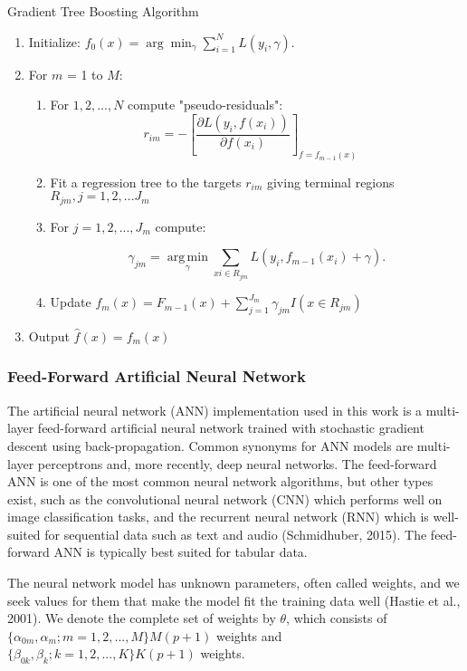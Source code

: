 \documentclass[12pt,]{article}
\begin{document}
\begin{algorithm}
  \caption{Gradient Tree Boosting Algorithm}\label{alg:GBMAlo}
\begin{enumerate}
\item Initialize: $f_0(x) = \arg\min_\gamma \sum_{i=1}^N L(y_i, \gamma).$
\item For $m$ = 1 to $M$:
  \begin{enumerate}
  \item For $1,2,...,N$ compute "pseudo-residuals":
  $$
   r_{im} = -\left[\frac{\partial L(y_i, f(x_i))}{\partial f(x_i)}\right]_{f=f_{m-1}(x)} \quad
  $$
  \item Fit a regression tree to the targets $r_{im}$ giving terminal regions $R_{jm}, j = 1,2,...J_m$
  \item For $j = 1,2,...,J_m$ compute:
  
  $$
  \gamma_{jm} = \underset{\gamma}{\operatorname{arg\,min}} \sum_{xi \in R_{jm}} L\left(y_i, f_{m-1}(x_i) + \gamma \right).
  $$
  \item Update $f_m(x) = F_{m-1}(x) + \sum_{j=1}^{J_m}\gamma_{jm}I(x \in R_{jm})$
  \end{enumerate}
\item Output $\hat{f}(x) = f_m(x)$
\end{enumerate}
\end{algorithm}

\hypertarget{feed-forward-artificial-neural-network}{%
\subsubsection{Feed-Forward Artificial Neural
Network}\label{feed-forward-artificial-neural-network}}

The artificial neural network (ANN) implementation used in this work is
a multi-layer feed-forward artificial neural network trained with
stochastic gradient descent using back-propagation. Common synonyms for
ANN models are multi-layer perceptrons and, more recently, deep neural
networks. The feed-forward ANN is one of the most common neural network
algorithms, but other types exist, such as the convolutional neural
network (CNN) which performs well on image classification tasks, and the
recurrent neural network (RNN) which is well-suited for sequential data
such as text and audio (Schmidhuber, 2015). The feed-forward ANN is
typically best suited for tabular data.

The neural network model has unknown parameters, often called weights,
and we seek values for them that make the model fit the training data
well (Hastie et al., 2001). We denote the complete set of weights by
\(\theta\), which consists of
\(\{\alpha_{0m},\alpha_m;m=1,2,...,M\} M(p+1)\) weights and
\(\{\beta_{0k},\beta_k;k=1,2,...,K\} K(p+1)\) weights.
\end{document}
